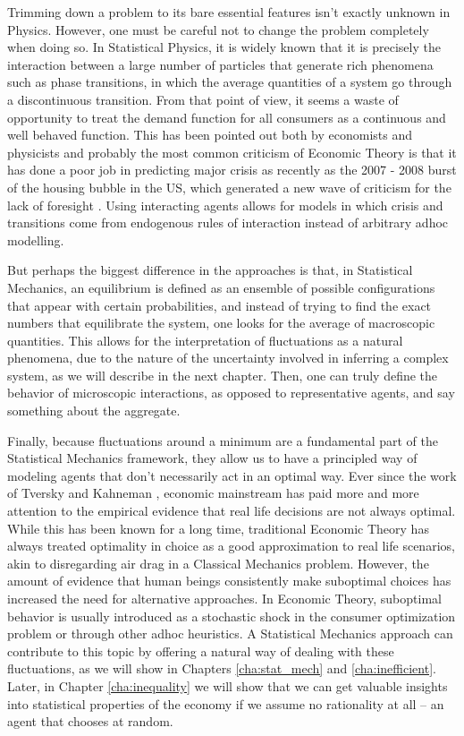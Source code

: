 Trimming down a problem to its bare essential features isn't exactly unknown in Physics. However, one must be careful not to change the problem completely when doing so. In Statistical Physics, it is widely known that it is precisely the interaction between a large number of particles that generate rich phenomena such as phase transitions, in which the average quantities of a system go through a discontinuous transition. From that point of view, it seems a waste of opportunity to treat the demand function for all consumers as a continuous and well behaved function. This has been pointed out both by economists \cite{Kirman92, KirmanBook} and physicists \cite{Bouchaud13, Bouchaud07} and probably the most common criticism of Economic Theory is that it has done a poor job in predicting major crisis as recently as the 2007 - 2008 burst of the housing bubble in the US, which generated a new wave of criticism for the lack of foresight \cite{BouchaudCrisis}. Using interacting agents allows for models in which crisis and transitions come from endogenous rules of interaction instead of arbitrary adhoc modelling.

But perhaps the biggest difference in the approaches is that, in Statistical Mechanics, an equilibrium is defined as an ensemble of possible configurations that appear with certain probabilities, and instead of trying to find the exact numbers that equilibrate the system, one looks for the average of macroscopic quantities. This allows for the interpretation of fluctuations as a natural phenomena, due to the nature of the uncertainty involved in inferring a complex system, as we will describe in the next chapter. Then, one can truly define the behavior of microscopic interactions, as opposed to representative agents, and say something about the aggregate.

Finally, because fluctuations around a minimum are a fundamental part of the Statistical Mechanics framework, they allow us to have a principled way of modeling agents that don't necessarily act in an optimal way. Ever since the work of Tversky and Kahneman \cite{Tversky74, Kahneman79, Tversky81}, economic mainstream has paid more and more attention to the empirical evidence that real life decisions are not always optimal. While this has been known for a long time, traditional Economic Theory has always treated optimality in choice as a good approximation to real life scenarios, akin to disregarding air drag in a Classical Mechanics problem. However, the amount of evidence that human beings consistently make suboptimal choices has increased the need for alternative approaches. In Economic Theory, suboptimal behavior is usually introduced as a stochastic shock in the consumer optimization problem or through other adhoc heuristics. A Statistical Mechanics approach can contribute to this topic by offering a natural way of dealing with these fluctuations, as we will show in Chapters \ref{cha:stat_mech} and \ref{cha:inefficient}. Later, in Chapter \ref{cha:inequality} we will show that we can get valuable insights into statistical properties of the economy if we assume no rationality at all -- an agent that chooses at random.